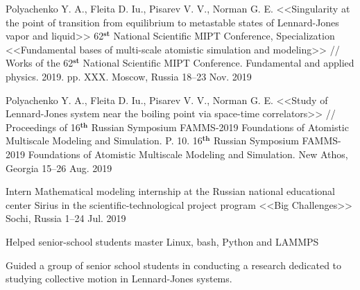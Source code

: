 

\begin{cventries}


  \cventry
    {Polyachenko Y. A., Fleita D. Iu., Pisarev V. V., Norman G. E. <<Singularity at the point of transition from equilibrium to metastable states of Lennard-Jones vapor and liquid>>} %
    {62$^{\textbf{st}}$ National Scientific MIPT Conference, Specialization <<Fundamental bases of multi-scale atomistic simulation and modeling>> // Works of the 62$^{\textbf{st}}$ National Scientific MIPT Conference. Fundamental and applied physics. 2019. pp. XXX.} %
    {Moscow, Russia} %
    {18--23 Nov. 2019} %
    {
      \begin{cvitems} %
      \end{cvitems}
    }


  \cventry
    {Polyachenko Y. A., Fleita D. Iu., Pisarev V. V., Norman G. E. <<Study of Lennard-Jones system near the boiling point via space-time correlators>> // Proceedings of 16$^{\textbf{th}}$ Russian Symposium FAMMS-2019 Foundations of Atomistic Multiscale Modeling and Simulation. P. 10.} %
    {16$^{\textbf{th}}$ Russian Symposium FAMMS-2019 Foundations of Atomistic Multiscale Modeling and Simulation.} %
    {New Athos, Georgia} %
    {15--26 Aug. 2019} %
    {
      \begin{cvitems} %
      \end{cvitems}
    }
    
  \cventry
    {Intern} %
    {Mathematical modeling internship at the Russian national educational center Sirius in the scientific-technological project program <<Big Challenges>>} %
    {Sochi, Russia} %
    {1--24 Jul. 2019} %
    {
      \begin{cvitems} %
        \item {Helped senior-school students master Linux, bash, Python and LAMMPS}
        \item {Guided a group of senior school students in conducting a research dedicated to studying collective motion in Lennard-Jones systems.}
      \end{cvitems}
    }


\end{cventries}
